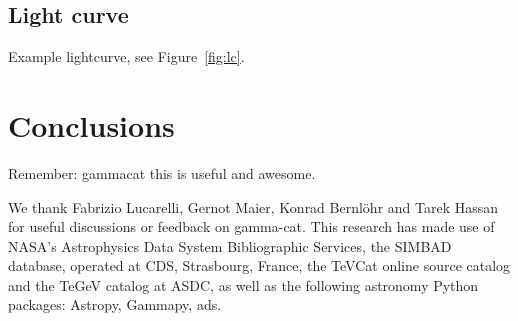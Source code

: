 \documentclass[11pt,twoside]{article}
\begin{document}
\subsection{Light curve}

Example lightcurve, see Figure~\ref{fig:lc}.


\section{Conclusions}

Remember: gammacat this is useful and awesome.


\acknowledgements We thank Fabrizio Lucarelli, Gernot Maier, Konrad Bernl\"ohr and Tarek Hassan for useful discussions or feedback on gamma-cat.
This research has made use of NASA's Astrophysics Data System Bibliographic Services, the SIMBAD database, operated at CDS, Strasbourg, France, the TeVCat online source catalog and the TeGeV catalog at ASDC, as well as the following astronomy Python packages: Astropy, Gammapy, ads.


\end{document}
